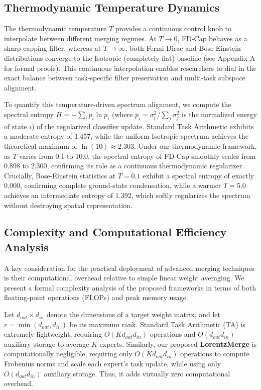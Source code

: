 \documentclass{article}
\theoremstyle{plain}
\theoremstyle{definition}
\theoremstyle{remark}
\begin{document}
\subsection{Thermodynamic Temperature Dynamics}
The thermodynamic temperature $T$ provides a continuous control knob to interpolate between different merging regimes. At $T \to 0$, FD-Cap behaves as a sharp capping filter, whereas at $T \to \infty$, both Fermi-Dirac and Bose-Einstein distributions converge to the Isotropic (completely flat) baseline (see Appendix A for formal proofs). This continuous interpolation enables researchers to dial in the exact balance between task-specific filter preservation and multi-task subspace alignment.

To quantify this temperature-driven spectrum alignment, we compute the spectral entropy $H = -\sum_i p_i \ln p_i$ (where $p_i = \sigma_i^2 / \sum_j \sigma_j^2$ is the normalized energy of state $i$) of the regularized classifier update. Standard Task Arithmetic exhibits a moderate entropy of 1.457, while the uniform Isotropic spectrum achieves the theoretical maximum of $\ln(10) \approx 2.303$. Under our thermodynamic framework, as $T$ varies from 0.1 to 10.0, the spectral entropy of FD-Cap smoothly scales from 0.898 to 2.300, confirming its role as a continuous thermodynamic regularizer. Crucially, Bose-Einstein statistics at $T=0.1$ exhibit a spectral entropy of exactly 0.000, confirming complete ground-state condensation, while a warmer $T=5.0$ achieves an intermediate entropy of 1.392, which softly regularizes the spectrum without destroying spatial representation.

\subsection{Complexity and Computational Efficiency Analysis}
A key consideration for the practical deployment of advanced merging techniques is their computational overhead relative to simple linear weight averaging. We present a formal complexity analysis of the proposed frameworks in terms of both floating-point operations (FLOPs) and peak memory usage.

Let $d_{out} \times d_{in}$ denote the dimensions of a target weight matrix, and let $r = \min(d_{out}, d_{in})$ be its maximum rank. Standard Task Arithmetic (TA) is extremely lightweight, requiring $O(K d_{out} d_{in})$ operations and $O(d_{out} d_{in})$ auxiliary storage to average $K$ experts. Similarly, our proposed \textbf{LorentzMerge} is computationally negligible, requiring only $O(K d_{out} d_{in})$ operations to compute Frobenius norms and scale each expert's task update, while using only $O(d_{out} d_{in})$ auxiliary storage. Thus, it adds virtually zero computational overhead.
\end{document}
